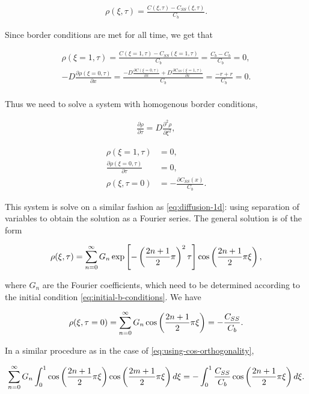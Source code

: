 \begin{align}
	\rho(\xi, \tau) = \frac{C(\xi,\tau)-C_{SS}(\xi, \tau)}{C_b}.
\end{align}

Since border conditions are met for all time, we get that 

\begin{align}
	\rho(\xi = 1, \tau) = \frac{C(\xi=1,\tau)-C_{SS}(\xi=1, \tau)}{C_b} = \frac{C_b - C_b}{C_b} = 0,\\
	-D\frac{\partial \rho(\xi = 0, \tau)}{\partial x} = \frac{-D\frac{\partial C(\xi=0,\tau)}{\partial x}+D\frac{\partial C_{SS}(\xi=1, \tau)}{\partial x}}{C_b} = \frac{-r + r}{C_b}=0.\\
\end{align}


Thus we need to solve a system with homogenous border conditions,

\begin{align}
	\frac{\partial \rho}{\partial \tau} = D\frac{\partial^2 \rho}{\partial \xi^2},
\end{align}

\begin{align}
	\rho(\xi = 1, \tau) &= 0, \\
	\frac{\partial\rho(\xi = 0, \tau)}{\partial \tau} &= 0, \\
	\rho(\xi, \tau = 0) &= -\frac{\partial C_{SS}(x)}{C_b}.
	\label{eq:initial-b-conditions}
\end{align}

This system is solve on a similar fashion as \ref{eq:diffusion-1d}: using separation of variables to obtain the solution as a Fourier series. The general solution is of the form

\begin{align}
	\rho(\xi, \tau) = \sum_{n=0}^{\infty} G_n \exp\left[{-\left({\frac{2n+1}{2}\pi}\right)^2\tau}\right]\cos\left({\frac{2n+1}{2}\pi\xi}\right),
\end{align}

where $G_n$ are the Fourier coefficients, which need to be determined according to the initial condition \ref{eq:initial-b-conditions}. We have

\begin{align}
	\rho(\xi, \tau = 0) = \sum_{n=0}^{\infty} G_n \cos\left({\frac{2n+1}{2}\pi\xi}\right) = -\frac{C_{SS}}{C_b}.
\end{align}

In a similar procedure as in the case of \ref{eq:using-cos-orthogonality},

\begin{align}
	\sum_{n=0}^{\infty} G_n \int_{0}^{1}\cos\left({\frac{2n+1}{2}\pi\xi}\right)\cos\left({\frac{2m+1}{2}\pi\xi}\right) d\xi = -\int_0^1 \frac{C_{SS}}{C_b}\cos\left({\frac{2n+1}{2}\pi\xi}\right) d\xi.
\end{align}

